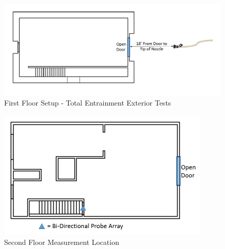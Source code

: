 \documentclass{article}
\begin{document}
\begin{figure}[!ht]
	\centering
	\includegraphics[width=6.5in]{Figures/Air_Entrainment/Measurement_Locations_Firstfloor_Ext}
	\caption{First Floor Setup - Total Entrainment Exterior Tests}
	\label{fig:First_Floor_Setup_Total_Entrainment_Exterior_Tests}
\end{figure}

\clearpage

\begin{figure}[!ht]
	\centering
	\includegraphics[width=4in]{Figures/Air_Entrainment/Measurement_Locations_Secondfloor}
	\caption{Second Floor Measurement Location}
	\label{fig:Second_Floor_Measurement_Location}
\end{figure}

\vspace*{\baselineskip}
\end{document}
